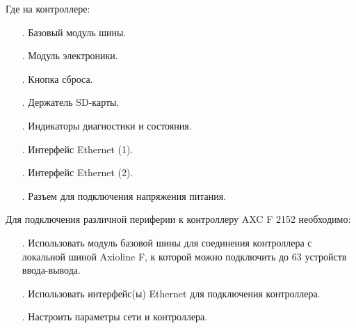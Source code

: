 {	\par \redline Где на контроллере:

	\begin{itemize}[leftmargin=2.15cm, labelwidth=0.65cm, labelsep=0.0cm] 

		\item[\theitemcntr. ] Базовый модуль шины.
		\addtocounter{itemcntr}{1}

		\item[\theitemcntr. ] Модуль электроники.
		\addtocounter{itemcntr}{1}

		\item[\theitemcntr. ] Кнопка сброса.
		\addtocounter{itemcntr}{1}

		\item[\theitemcntr. ] Держатель SD-карты.
		\addtocounter{itemcntr}{1}

		\item[\theitemcntr. ] Индикаторы диагностики и состояния.
		\addtocounter{itemcntr}{1}

		\item[\theitemcntr. ] Интерфейс Ethernet (1).
		\addtocounter{itemcntr}{1}

		\item[\theitemcntr. ] Интерфейс Ethernet (2).
		\addtocounter{itemcntr}{1}

		\item[\theitemcntr. ] Разъем для подключения напряжения питания.
		\addtocounter{itemcntr}{1}

	\end{itemize} \setcounter{itemcntr}{1}

	\par \redline Для подключения различной периферии к контроллеру AXC F 2152 необходимо:

	\begin{itemize}[leftmargin=2.15cm, labelwidth=0.65cm, labelsep=0.0cm] 

		\item[\theitemcntr. ] Использовать модуль базовой шины для соединения контроллера с локальной шиной Axioline F, к которой можно подключить до 63 устройств ввода-вывода.
		\addtocounter{itemcntr}{1}

		\item[\theitemcntr. ] Использовать интерфейс(ы) Ethernet для подключения контроллера.
		\addtocounter{itemcntr}{1}

		\item[\theitemcntr. ] Настроить параметры сети и контроллера.
		\addtocounter{itemcntr}{1}


\end{itemize}}
